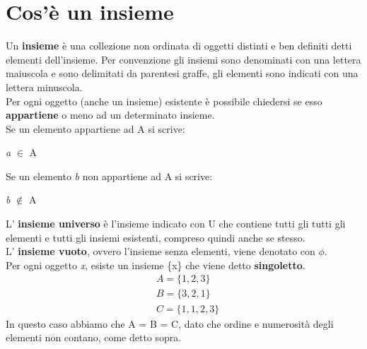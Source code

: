 \section{Cos'è un insieme}

Un \textbf{insieme} è una collezione non ordinata di oggetti distinti e ben definiti detti elementi dell'insieme.
Per convenzione gli insiemi sono denominati con una lettera maiuscola e sono delimitati da parentesi graffe, gli elementi sono indicati con una lettera minuscola. \\
Per ogni oggetto (anche un insieme) esistente è possibile chiedersi se esso \textbf{appartiene} o meno ad un determinato insieme. \\
Se un elemento appartiene ad A si scrive:
\begin{center}
    \textit{a} $\in$ A
\end{center}
Se un elemento \textit{b} non appartiene ad A si scrive:
\begin{center}
    \textit{b} $\notin$ A
\end{center}
L' \textbf{insieme universo} è l'insieme indicato con U che contiene tutti gli tutti gli elementi e tutti gli insiemi esistenti, compreso quindi anche se stesso. \\
L' \textbf{insieme vuoto}, ovvero l'insieme senza elementi, viene denotato con $\phi$. \\
Per ogni oggetto \textit{x}, esiste un insieme \{x\} che viene detto \textbf{singoletto}.
\begin{align*}
    &A = \{1, 2, 3\} \\
    &B = \{3, 2, 1\} \\
    &C = \{1, 1, 2, 3\}
\end{align*}
In questo caso abbiamo che A = B = C, dato che ordine e numerosità degli elementi non contano, come detto sopra. \\
